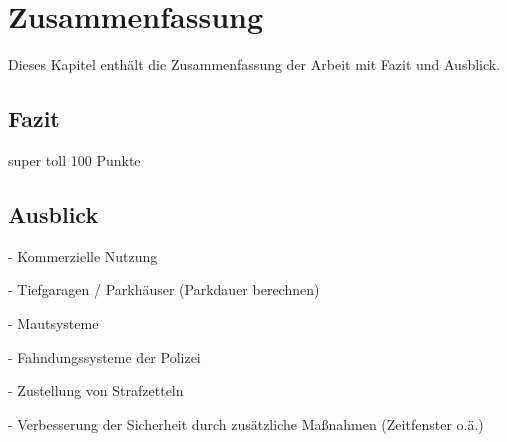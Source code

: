 \chapter{Zusammenfassung}

\nocite{*}

Dieses Kapitel enthält die Zusammenfassung der Arbeit mit Fazit und Ausblick.

\section{Fazit}

super toll 100 Punkte

\section{Ausblick}

- Kommerzielle Nutzung

- Tiefgaragen / Parkhäuser (Parkdauer berechnen)

- Mautsysteme

- Fahndungssysteme der Polizei

- Zustellung von Strafzetteln

- Verbesserung der Sicherheit durch zusätzliche Maßnahmen (Zeitfenster o.ä.)

